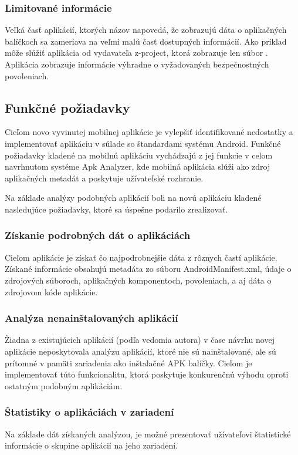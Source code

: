 \subsubsection{\textbf{Limitované informácie}}
Veľká časť aplikácií, ktorých názov napovedá, že zobrazujú dáta o aplikačných balíčkoch sa zameriava na veľmi malú časť dostupných informácií. Ako príklad môže slúžiť aplikácia  od vydavateľa z-project, ktorá zobrazuje len súbor . Aplikácia  zobrazuje informácie výhradne o vyžadovaných bezpečnostných povoleniach.

\subsection{Funkčné požiadavky}
Cieľom novo vyvinutej mobilnej aplikácie je vylepšiť identifikované nedostatky a implementovať aplikáciu v súlade so štandardami systému Android. Funkčné požiadavky kladené na mobilnú aplikáciu vychádzajú z jej funkcie v celom navrhnutom systéme Apk Analyzer, kde mobilná aplikácia slúži ako zdroj aplikačných metadát a poskytuje užívateľské rozhranie.


Na základe analýzy podobných aplikácií boli na novú aplikáciu kladené nasledujúce požiadavky, ktoré sa úspešne podarilo zrealizovať.

\subsubsection{\textbf{Získanie podrobných dát o aplikáciách}}
Cieľom aplikácie je získať čo najpodrobnejšie dáta z rôznych častí aplikácie. Získané informácie obsahujú metadáta zo súboru AndroidManifest.xml, údaje o zdrojových súboroch, aplikačných komponentoch, povoleniach, a aj dáta o zdrojovom kóde aplikácie. 

\subsubsection{\textbf{Analýza nenainštalovaných aplikácií}}
Žiadna z existujúcich aplikácií (podľa vedomia autora) v čase návrhu novej aplikácie neposkytovala analýzu aplikácií, ktoré nie sú nainštalované, ale sú prítomné v pamäti zariadenia ako inštalačné APK balíčky. Cieľom je implementovať túto funkcionalitu, ktorá poskytuje konkurenčnú výhodu oproti ostatným podobným aplikáciám.

\subsubsection{\textbf{Štatistiky o aplikáciách v zariadení}}
Na základe dát získaných analýzou, je možné prezentovať užívateľovi štatistické informácie o skupine aplikácií na jeho zariadení.

